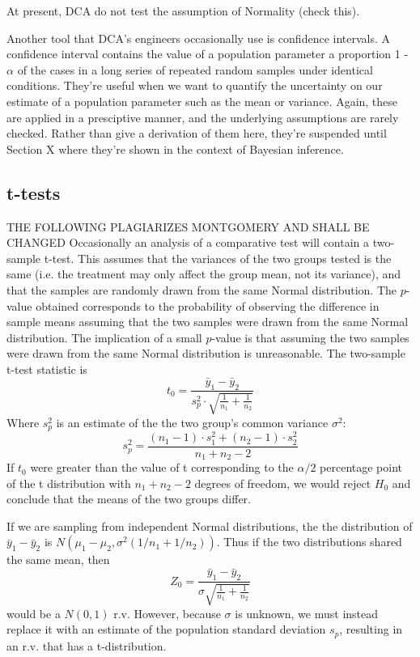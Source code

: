 \documentclass[11pt,a4paper,article]{memoir} %
\begin{document}
At present, DCA do not test the assumption of Normality (check this).
\par
Another tool that DCA's engineers occasionally use is confidence intervals. A confidence interval contains the value of a population parameter a proportion 1 - $\alpha$ of the cases in a long series of repeated random samples under identical conditions. They're useful when we want to quantify the uncertainty on our estimate of a population parameter such as the mean or variance. Again, these are applied in a presciptive manner, and the underlying assumptions are rarely checked. Rather than give a derivation of them here, they're suspended until Section X where they're shown in the context of Bayesian inference.
\subsection*{t-tests}
THE FOLLOWING PLAGIARIZES MONTGOMERY AND SHALL BE CHANGED
Occasionally an analysis of a comparative test will contain a two-sample t-test. This assumes that the variances of the two groups tested is the same (i.e. the treatment may only affect the group mean, not its variance), and that the samples are randomly drawn from the same Normal distribution. The $p$-value obtained corresponds to the probability of observing the difference in sample means assuming that the two samples were drawn from the same Normal distribution. The implication of a small $p$-value is that assuming the two samples were drawn from the same Normal distribution is unreasonable. The two-sample t-test statistic is
\[
	t_0 = \frac{\bar{y}_1 - \bar{y}_2}{s_p^2 \cdot \sqrt{\frac{1}{n_1} + \frac{1}{n_2}}}
\]
Where $s_p^2$ is an estimate of the the two group's common variance $\sigma^2$:
\[
	s_p^2 = \frac{(n_1	 - 1)\cdot s_1^2 + (n_2 - 1)\cdot s_2^2}{n_1 + n_2 - 2}	
\]
If $t_0$ were greater than the value of t corresponding to the $\alpha/2$ percentage point of the t distribution with $n_1 + n_2 - 2$ degrees of freedom, we would reject $H_0$ and conclude that the means of the two groups differ.
\par
If we are sampling from independent Normal distributions, the the distribution of $\bar{y}_1 - \bar{y}_2$ is $N(\mu_1 - \mu_2, \sigma^2(1/n_1 + 1/n_2))$. Thus if the two distributions shared the same mean, then
\[
	Z_0 = \frac{\bar{y}_1 - \bar{y}_2}{\sigma\sqrt{\frac{1}{n_1} + \frac{1}{n_2}}}
\]
would be a $N(0, 1)$ r.v. However, because $\sigma$ is unknown, we must instead replace it with an estimate of the population standard deviation $s_p$, resulting in an r.v. that has a t-distribution.
\newpage
\end{document}

